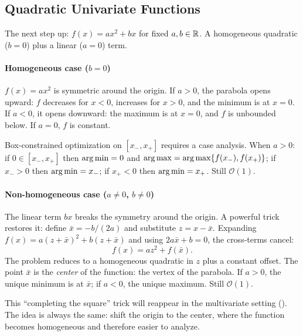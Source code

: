 \subsection{Quadratic Univariate Functions}\label{sec:quad-univariate}

The next step up: $f(x) = ax^2 + bx$ for fixed $a, b \in \mathbb{R}$.
A homogeneous quadratic ($b = 0$) plus a linear ($a = 0$) term.

\paragraph{Homogeneous case ($b = 0$)}

$f(x) = ax^2$ is symmetric around the origin.
If $a > 0$, the parabola opens upward: $f$ decreases for $x < 0$, increases for $x > 0$, and the minimum is at $x = 0$.
If $a < 0$, it opens downward: the maximum is at $x = 0$, and $f$ is unbounded below.
If $a = 0$, $f$ is constant.

Box-constrained optimization on $[x_-, x_+]$ requires a case analysis.
When $a > 0$: if $0 \in [x_-, x_+]$ then $\operatorname*{arg\,min} = 0$ and $\operatorname*{arg\,max} = \operatorname*{arg\,max}\{f(x_-), f(x_+)\}$; if $x_- > 0$ then $\operatorname*{arg\,min} = x_-$; if $x_+ < 0$ then $\operatorname*{arg\,min} = x_+$.
Still $\mathcal{O}(1)$.

\paragraph{Non-homogeneous case ($a \neq 0$, $b \neq 0$)}

The linear term $bx$ breaks the symmetry around the origin.
A powerful trick restores it: define $\bar{x} = -b / (2a)$ and substitute $z = x - \bar{x}$.
Expanding $f(x) = a(z + \bar{x})^2 + b(z + \bar{x})$ and using $2a\bar{x} + b = 0$, the cross-terms cancel:
\begin{equation}\label{eq:completing-square-univariate}
	f(x) = az^2 + f(\bar{x}).
\end{equation}
The problem reduces to a homogeneous quadratic in $z$ plus a constant offset.
The point $\bar{x}$ is the \emph{center} of the function: the vertex of the parabola.
If $a > 0$, the unique minimum is at $\bar{x}$; if $a < 0$, the unique maximum.
Still $\mathcal{O}(1)$.

\begin{remark}\label{rem:completing-square}
	This ``completing the square'' trick will reappear in the multivariate setting ().
	The idea is always the same: shift the origin to the center, where the function becomes homogeneous and therefore easier to analyze.
\end{remark}


